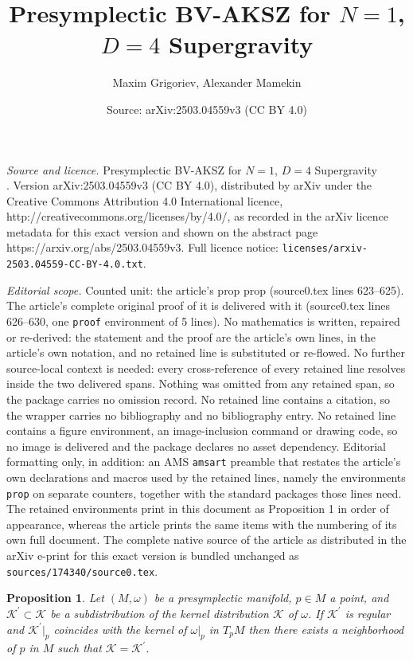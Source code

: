 \documentclass[10pt,a4paper]{amsart}
\title{Presymplectic BV-AKSZ for $N=1$, $D=4$ Supergravity\\ \vspace{0.5cm}}
\author{Maxim Grigoriev, Alexander Mamekin}
\date{Source: arXiv:2503.04559v3 (CC BY 4.0)}
\newtheorem{prop}{Proposition}
\def\cK{\mathcal{K}}
\begin{document}
\maketitle

\noindent\emph{Source and licence.} Presymplectic BV-AKSZ for $N=1$, $D=4$ Supergravity\\ \vspace{0.5cm}. Version arXiv:2503.04559v3 (CC BY 4.0), distributed by arXiv under the Creative Commons Attribution 4.0 International licence, http://creativecommons.org/licenses/by/4.0/, as recorded in the arXiv licence metadata for this exact version and shown on the abstract page https://arxiv.org/abs/2503.04559v3. Full licence notice: \texttt{licenses/arxiv-2503.04559-CC-BY-4.0.txt}.\par\smallskip

\noindent\textit{Editorial scope.} Counted unit: the article's prop prop (source0.tex lines 623--625). The article's complete original proof of it is delivered with it (source0.tex lines 626--630, one \texttt{proof} environment of 5 lines). No mathematics is written, repaired or re-derived: the statement and the proof are the article's own lines, in the article's own notation, and no retained line is substituted or re-flowed.  No further source-local context is needed: every cross-reference of every retained line resolves inside the two delivered spans.  Nothing was omitted from any retained span, so the package carries no omission record.  No retained line contains a citation, so the wrapper carries no bibliography and no bibliography entry.  No retained line contains a figure environment, an image-inclusion command or drawing code, so no image is delivered and the package declares no asset dependency.  Editorial formatting only, in addition: an AMS \texttt{amsart} preamble that restates the article's own declarations and macros used by the retained lines, namely the environments \texttt{prop} on separate counters, together with the standard packages those lines need.  The retained environments print in this document as Proposition 1 in order of appearance, whereas the article prints the same items with the numbering of its own full document.  The complete native source of the article as distributed in the arXiv e-print for this exact version is bundled unchanged as \texttt{sources/174340/source0.tex}.
\begin{prop}
Let $(M,\omega)$ be a presymplectic manifold, $p\in M$  a point, and $\cK^\prime \subset \cK$ be a subdistribution of the kernel distribution $\cK$ of $\omega$. If $\cK^\prime$ is regular and $\cK^\prime|_p$ coincides with the kernel of $\omega|_p$ in $T_pM$ then there exists a neighborhood of $p$ in $M$ such that $\cK=\cK^\prime$. 
\end{prop}
\end{document}
